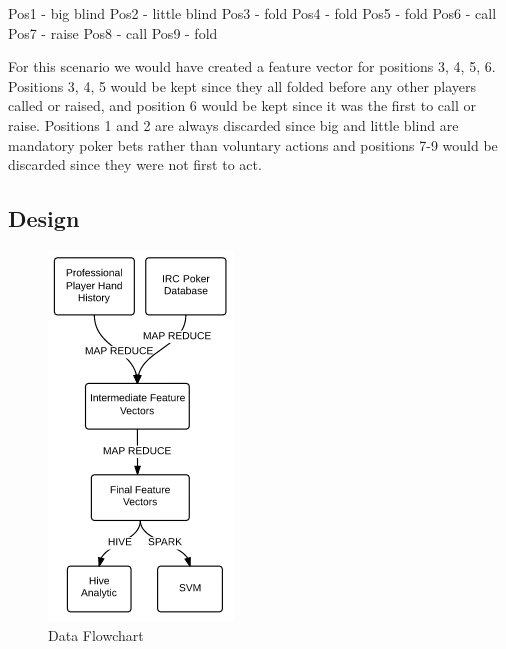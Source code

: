 \documentclass[twoside]{article}
\begin{document}
\begin{multicols}{2}
Pos1 - big blind\newline
\indent Pos2 - little blind\newline
\indent Pos3 - fold\newline
\indent Pos4 - fold\newline
\indent Pos5 - fold\newline
\indent Pos6 - call\newline
\indent Pos7 - raise\newline
\indent Pos8 - call\newline
\indent Pos9 - fold

For this scenario we would have created a feature vector for positions 3, 4, 5, 6. Positions 3, 4, 5 would be kept since they all folded before any other players called or raised, and position 6 would be kept since it was the first to call or raise. 
Positions 1 and 2 are always discarded since big and little blind are mandatory poker bets rather than voluntary actions and positions 7-9 would be discarded since they were not first to act. 

\subsection{Design}

\begin{figure}[H]
  \centering
  \centerline{\includegraphics[width=0.5\columnwidth]{Flowchart.png}}
   \caption{Data Flowchart}
  \label{fig:Data flow}
\end{figure}


\end{multicols}
\end{document}
